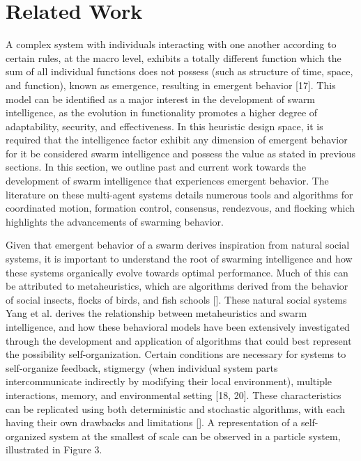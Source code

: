 \section*{Related Work}

A complex system with individuals interacting with one another according to certain rules, at the macro level, exhibits a totally different function which the sum of all individual functions does not possess (such as structure of time, space, and function), known as emergence, resulting in emergent behavior [17]. This model can be identified as a major interest in the development of swarm intelligence, as the evolution in functionality promotes a higher degree of adaptability, security, and effectiveness. In this heuristic design space, it is required that the intelligence factor exhibit any dimension of emergent behavior for it be considered swarm intelligence and possess the value as stated in previous sections. In this section, we outline past and current work towards the development of swarm intelligence that experiences emergent behavior. The literature on these multi-agent systems details numerous tools and algorithms for coordinated motion, formation control, consensus, rendezvous, and flocking which highlights the advancements of swarming behavior.


Given that emergent behavior of a swarm derives inspiration from natural social systems, it is important to understand the root of swarming intelligence and how these systems organically evolve towards optimal performance. Much of this can be attributed to metaheuristics, which are algorithms derived from the behavior of social insects, flocks of birds, and fish schools []. These natural social systems Yang et al. derives the relationship between metaheuristics and swarm intelligence, and how these behavioral models have been extensively investigated through the development and application of algorithms that could best represent the possibility self-organization. Certain conditions are necessary for systems to self-organize feedback, stigmergy (when individual system parts intercommunicate indirectly by modifying their local environment), multiple interactions, memory, and environmental setting [18, 20]. These characteristics can be replicated using both deterministic and stochastic algorithms, with each having their own drawbacks and limitations []. A representation of a self-organized system at the smallest of scale can be observed in a particle system, illustrated in Figure 3.

